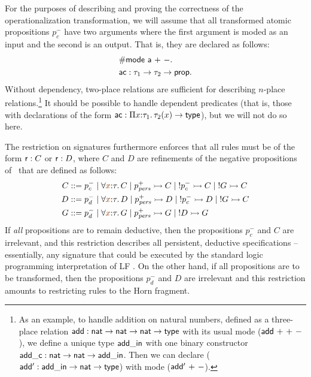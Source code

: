 For the purposes of describing and proving the correctness of the
operationalization transformation, we will assume that all transformed
atomic propositions $p_c^-$ have two arguments where the first
argument is moded as an input and the second is an output. That is,
they are declared as follows:
\begin{align*}
& {\sf \#mode~a~{+}~{-}}.\\
& {\sf ac} : \tau_1 \rightarrow \tau_2 \rightarrow {\sf prop}.
\end{align*}
Without dependency, two-place relations are sufficient for describing
$n$-place relations.\footnote{As an example, to handle addition on
  natural numbers, defined as a three-place relation ${\sf add} : {\sf
    nat} \rightarrow {\sf nat} \rightarrow {\sf nat} \rightarrow {\sf
    type}$ with its usual mode (${\sf add}~{+}~{+}~{-}$), we define a
  unique type ${\sf add\_in}$ with one binary constructor ${\sf
    add\_c} : {\sf nat} \rightarrow {\sf nat} \rightarrow {\sf
    add\_in}$. Then we can declare (${\sf add'} : {\sf add\_in}
  \rightarrow {\sf nat} \rightarrow {\sf type}$) with mode (${\sf
    add'}~{+}~{-}$).}  It should be possible to handle dependent
predicates (that is, those with declarations of the form ${\sf ac} :
\Pi x{:}\tau_1.\,\tau_2(x) \rightarrow {\sf type}$), but we will not do
so here.

The restriction on signatures furthermore enforces that all rules must
be of the form ${\sf r} : C$ or ${\sf r} : D$, where $C$ and $D$ are
refinements of the negative propositions of \sls~that are defined as
follows:
\begin{align*}
C & ::= p^-_{c} 
    \mid \forall \lf x{:}\tau.\, C
    \mid p^+_\mpers \lefti C
    \mid {!}p^-_c \lefti C
    \mid {!}G \lefti C \\
D & ::= p^-_{d}
    \mid \forall \lf x{:}\tau.\, D
    \mid p^+_\mpers \lefti D
    \mid {!}p^-_c \lefti D
    \mid {!}G \lefti C \\
G & ::= p^-_d 
    \mid \forall \lf x{:}\tau.\, G
    \mid p^+_\mpers \lefti G
    \mid {!}D \lefti G
\end{align*}
If {\it all} propositions are to remain deductive, then the
propositions $p^-_c$ and $C$ are irrelevant, and this restriction
describes all persistent, deductive specifications -- essentially, any
signature that could be executed by the standard logic programming
interpretation of LF \cite{pfenning89elf}. On the other hand, if all
propositions are to be transformed, then the propositions $p^-_d$ and
$D$ are irrelevant and this restriction amounts to restricting
rules to the Horn fragment.

